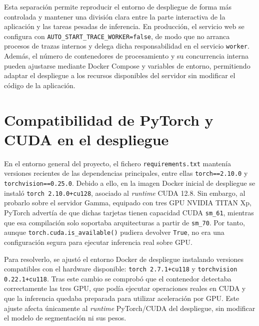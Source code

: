 Esta separación permite reproducir el entorno de despliegue de forma más controlada y mantener una división clara entre la parte interactiva de la aplicación y las tareas pesadas de inferencia. En producción, el servicio web se configura con \texttt{AUTO\_START\_TRACE\_WORKER=false}, de modo que no arranca procesos de trazas internos y delega dicha responsabilidad en el servicio \texttt{worker}. Además, el número de contenedores de procesamiento y su concurrencia interna pueden ajustarse mediante Docker Compose y variables de entorno, permitiendo adaptar el despliegue a los recursos disponibles del servidor sin modificar el código de la aplicación.

\section{Compatibilidad de PyTorch y CUDA en el despliegue}

En el entorno general del proyecto, el fichero \texttt{requirements.txt} mantenía versiones recientes de las dependencias principales, entre ellas \texttt{torch==2.10.0} y \texttt{torchvision==0.25.0}. Debido a ello, en la imagen Docker inicial de despliegue se instaló \texttt{torch 2.10.0+cu128}, asociado al \textit{runtime} CUDA 12.8. Sin embargo, al probarlo sobre el servidor Gamma, equipado con tres GPU NVIDIA TITAN Xp, PyTorch advertía de que dichas tarjetas tienen capacidad CUDA \texttt{sm\_61}, mientras que esa compilación solo soportaba arquitecturas a partir de \texttt{sm\_70}. Por tanto, aunque \texttt{torch.cuda.is\_available()} pudiera devolver \texttt{True}, no era una configuración segura para ejecutar inferencia real sobre GPU.

Para resolverlo, se ajustó el entorno Docker de despliegue instalando versiones compatibles con el hardware disponible: \texttt{torch 2.7.1+cu118} y \texttt{torchvision 0.22.1+cu118}. Tras este cambio se comprobó que el contenedor detectaba correctamente las tres GPU, que podía ejecutar operaciones reales en CUDA y que la inferencia quedaba preparada para utilizar aceleración por GPU. Este ajuste afecta únicamente al \textit{runtime} PyTorch/CUDA del despliegue, sin modificar el modelo de segmentación ni sus pesos.